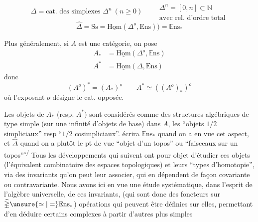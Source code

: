 \[
 \mathbb{\Delta}=\text{cat. des simplexes }\Delta^n\ (n\geq0)
 \qquad\substack{\Delta^n=[0,n]\subset\mathbb{N}\\\text{avec rel. d'ordre total}}
\]
\[
 \widehat{\mathbb{\Delta}}=\mathrm{Ss}
 =\underline{\mathrm{Hom}}(\mathbb{\Delta}^o,\mathrm{E}\mathrm{ns}))
 =\mathbb{E}\mathrm{ns}_*
\]

Plus généralement, si $A$ est une catégorie, on pose
\[
 \begin{aligned}
 A_*&=\underline{\mathrm{Hom}}(\mathbb{\Delta}^o,\mathbb{E}\mathrm{ns})\\
 A^*&=\underline{\mathrm{Hom}}(\mathbb{\Delta},\mathrm{Ens})
 \end{aligned}
\]
donc
\[
 (A^o)^*=(A_*)^o\qquad A^*\simeq((A^o)_*)^o
\]
où l'exposant $o$ désigne le  cat. opposée.

Les objets de $A_*$ (resp. $A^*$) sont considérés comme des structures algébriques de type simple (sur une infinité d'objets de base) dans $A$, les ``objets $1/2$ simpliciaux'' resp ``$1/2$ cosimpliciaux''.  écrira $\mathbb{E}\mathrm{ns}_*$ quand on a en vue cet aspect, et $\widehat{\mathbb{\Delta}}$  quand on a plutôt le pt de vue ``objet d'un topos'' ou ``faisceaux sur un topos''\deleted{\unsure{,}}\textsuperscript{$\circ\!/$}%
Tous les développements qui suivent ont pour objet d'étudier ces objets (l'équivalent combinatoire des espaces topologiques) et leurs ``types d'homotopie'', via des invariants qu'on peut leur associer, qui en dépendent de façon covariante ou contravariante. Nous avons ici en vue une étude systématique, dans l'esprit de l'algèbre universelle, de ces invariants, (qui sont donc des foncteurs sur $\widehat{\mathbb{\Delta}}\unsure{\simeq|=}\mathbb{E}\mathrm{ns}_*$)   opérations qui peuvent être définies sur elles, permettant d'en déduire certains complexes \unsure{:} à partir d'autres plus simples

